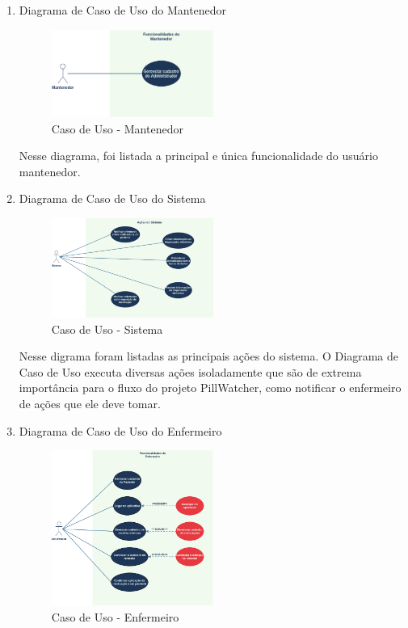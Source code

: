 \begin{enumerate}
    \item Diagrama de Caso de Uso do Mantenedor
    
\begin{figure}[H]
    \centering
    \includegraphics[width=0.5\textwidth]{figuras/matenedor-us.png}
    \caption{Caso de Uso - Mantenedor}
    \label{fig:mantenedor_us}
\end{figure}

Nesse diagrama, foi listada a principal e única funcionalidade do usuário mantenedor.
    \item Diagrama de Caso de Uso do Sistema
    
\begin{figure}[H]
    \centering
    \includegraphics[width=0.5\textwidth]{figuras/sistema-us.png}
    \caption{Caso de Uso - Sistema}
    \label{fig:sistema_us}
\end{figure}

Nesse digrama foram listadas as principais ações do sistema. O Diagrama de Caso de Uso executa diversas ações isoladamente que são de extrema importância para o fluxo do projeto PillWatcher, como notificar o enfermeiro de ações que ele deve tomar.

    \item Diagrama de Caso de Uso do Enfermeiro
    
\begin{figure}[H]
    \centering
    \includegraphics[width=0.5\textwidth]{figuras/enfermeiro-us.png}
    \caption{Caso de Uso - Enfermeiro}
    \label{fig:enfermeiro_us}
\end{figure}


\end{enumerate}
